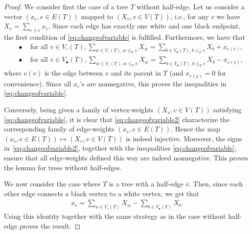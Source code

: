 \documentclass[12pt]{amsart}
\theoremstyle{plain}
\theoremstyle{remark}
\begin{document}
\begin{proof}
We consider first the case of a tree $T$ without half-edge. 
Let us consider a vector $(x_e, e \in E(T))$ mapped to $(X_v, v \in V(T))$,
i.e., for any $v$ we have  $X_v=\sum_{e \ni v} x_e$.
Since each edge has exactly one white and one black endpoint, the first condition of \eqref{eq:changeofvariable} is fulfilled. Furthermore, we have that 
\begin{align}
\label{eq:changeofvariable2}
\quad\bullet\quad \text{for all } v \in V_{\circ}(T), \sum_{w  \in V_{\circ}(T), w \le_T v} X_{w} = 
\sum_{b \in V_{\bullet}(T), b \le_T v} X_b + x_{e(v)}, \nonumber\\
\quad\bullet\quad \text{for all } v \in V_{\bullet}(T),
\sum_{w \in V_{\circ}(T), w \le_T v} X_w =
\sum_{b \in V_{\bullet}(T),  b \le_T v} X_{b} - x_{e(v)},
\end{align}
where $e(v)$ is the edge between $v$ and its parent in $T$ (and $x_{e(\rho)}=0$ for convenience).
Since all $x_{e}$'s are nonnegative, this proves the inequalities in \eqref{eq:changeofvariable}.

Conversely, being given a family of vertex-weights $(X_v, v \in V(T))$ satisfying \eqref{eq:changeofvariable}, it is clear that \eqref{eq:changeofvariable2} characterize the corresponding family of edge-weights $(x_e, e \in E(T))$.
Hence the map $(x_e, e \in E(T)) \mapsto (X_v, v \in V(T))$ is indeed injective.
 Moreover, the signs in~\eqref{eq:changeofvariable2}, together with the inequalities \eqref{eq:changeofvariable},
 ensure that all edge-weights defined this way are indeed nonnegative.
 This proves the lemma for trees without half-edges.
 
We now consider the case where $T$ is a tree with a half-edge $\overline{e}$. Then, since each other edge connects a black vertex to a white vertex, we get that
\begin{align*}
x_{\overline{e}}=\sum_{w  \in V_{\circ}(T)} X_w - \sum_{b \in V_{\bullet}(T)} X_b.
\end{align*}
Using this identity together with the same strategy as in the case without half-edge proves the result.
\end{proof}
\end{document}
